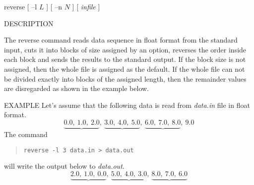 
\begin{synopsis}
\item[reverse] [ --l $L$ ] [ --n $N$ ] [ {\em infile} ]
\end{synopsis}

\begin{qsection}{DESCRIPTION}

The reverse command reads data sequence in float format from
the standard input, cuts it into blocks of size assigned by an option,
reverses the order inside each block and sends the results
to the standard output.
If the block size is not assigned, then the whole file is assigned
as the default.
If the whole file can not be divided exactly into blocks of the
assigned length, then the remainder values are disregarded as
shown in the example below.

\end{qsection}

\begin{options}
\end{options}

\begin{qsection}{EXAMPLE}
Let's assume that the following data
is read from {\em data.in} file in float format.
\begin{displaymath}
 \underbrace{0.0, ~1.0, ~2.0}, ~
 \underbrace{3.0, ~4.0, ~5.0}, ~
 \underbrace{6.0, ~7.0, ~8.0}, ~9.0
\end{displaymath}
The command
\begin{quote}
\verb!reverse -l 3 data.in > data.out!
\end{quote}
will write the output below to {\em data.out}.
\begin{displaymath}
 \underbrace{2.0, ~1.0, ~0.0}, ~
 \underbrace{5.0, ~4.0, ~3.0}, ~
 \underbrace{8.0, ~7.0, ~6.0}
\end{displaymath}
\end{qsection}

